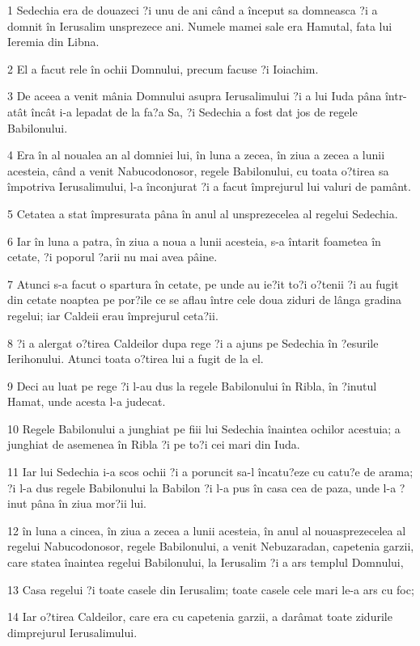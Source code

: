 \par 1 Sedechia era de douazeci ?i unu de ani când a început sa domneasca ?i a domnit în Ierusalim unsprezece ani. Numele mamei sale era Hamutal, fata lui Ieremia din Libna.
\par 2 El a facut rele în ochii Domnului, precum facuse ?i Ioiachim.
\par 3 De aceea a venit mânia Domnului asupra Ierusalimului ?i a lui Iuda pâna într-atât încât i-a lepadat de la fa?a Sa, ?i Sedechia a fost dat jos de regele Babilonului.
\par 4 Era în al noualea an al domniei lui, în luna a zecea, în ziua a zecea a lunii acesteia, când a venit Nabucodonosor, regele Babilonului, cu toata o?tirea sa împotriva Ierusalimului, l-a înconjurat ?i a facut împrejurul lui valuri de pamânt.
\par 5 Cetatea a stat împresurata pâna în anul al unsprezecelea al regelui Sedechia.
\par 6 Iar în luna a patra, în ziua a noua a lunii acesteia, s-a întarit foametea în cetate, ?i poporul ?arii nu mai avea pâine.
\par 7 Atunci s-a facut o spartura în cetate, pe unde au ie?it to?i o?tenii ?i au fugit din cetate noaptea pe por?ile ce se aflau între cele doua ziduri de lânga gradina regelui; iar Caldeii erau împrejurul ceta?ii.
\par 8 ?i a alergat o?tirea Caldeilor dupa rege ?i a ajuns pe Sedechia în ?esurile Ierihonului. Atunci toata o?tirea lui a fugit de la el.
\par 9 Deci au luat pe rege ?i l-au dus la regele Babilonului în Ribla, în ?inutul Hamat, unde acesta l-a judecat.
\par 10 Regele Babilonului a junghiat pe fiii lui Sedechia înaintea ochilor acestuia; a junghiat de asemenea în Ribla ?i pe to?i cei mari din Iuda.
\par 11 Iar lui Sedechia i-a scos ochii ?i a poruncit sa-l încatu?eze cu catu?e de arama; ?i l-a dus regele Babilonului la Babilon ?i l-a pus în casa cea de paza, unde l-a ?inut pâna în ziua mor?ii lui.
\par 12 în luna a cincea, în ziua a zecea a lunii acesteia, în anul al nouasprezecelea al regelui Nabucodonosor, regele Babilonului, a venit Nebuzaradan, capetenia garzii, care statea înaintea regelui Babilonului, la Ierusalim ?i a ars templul Domnului,
\par 13 Casa regelui ?i toate casele din Ierusalim; toate casele cele mari le-a ars cu foc;
\par 14 Iar o?tirea Caldeilor, care era cu capetenia garzii, a darâmat toate zidurile dimprejurul Ierusalimului.

